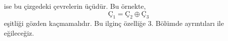 \documentclass[11pt]{amsbook}
\begin{document}

ise bu çizgedeki çevrelerin üçüdür. Bu örnekte,
    \[
    Ç_1 = Ç_2 \oplus Ç_3
    \]
eşitliği gözden kaçmamalıdır. Bu ilginç özelliğe 3. Bölümde ayrıntıları ile eğileceğiz.
\end{document}
